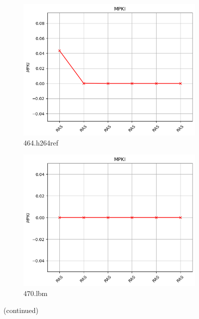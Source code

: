 \documentclass{article}
\begin{document}
\begin{figure}[H]
    \vspace{0.5cm} %

    \begin{subfigure}[b]{0.45\textwidth}
        \includegraphics[width=\textwidth]{figures/5_5/464.h264ref.cslab_branch_preds_ref.out.png}
        \caption{464.h264ref}
        \label{fig:plot77}
    \end{subfigure}
    \hfill
    \begin{subfigure}[b]{0.45\textwidth}
        \includegraphics[width=\textwidth]{figures/5_5/470.lbm.cslab_branch_preds_ref.out.png}
        \caption{470.lbm}
        \label{fig:plot78}
    \end{subfigure}

    \vspace{0.5cm} %

    \caption{(continued)}
    \label{fig:ras_part3}
\end{figure}
\end{document}
